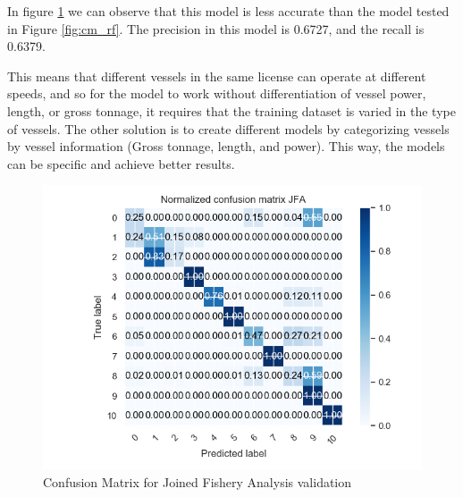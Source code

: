 In figure \ref{fig:val_jfa} we can observe that this model is less accurate than the model tested in Figure \ref{fig:cm_rf}. 
The precision in this model is 0.6727, and the recall is 0.6379.

This means that different vessels in the same license can operate at different speeds, and so for the model to work without differentiation of vessel power, length, or gross tonnage, it requires that the training dataset is varied in the type of vessels.
The other solution is to create different models by categorizing vessels by vessel information (Gross tonnage, length, and power). This way, the models can be specific and achieve better results. 

\begin{figure}[H]
\centering
\includegraphics[width=0.8\linewidth]{Chapters/img/val_JFA.png}
\caption{Confusion Matrix for Joined Fishery Analysis validation }
\label{fig:val_jfa}
\end{figure}





